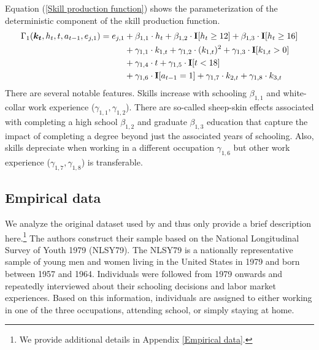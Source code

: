 \noindent Equation (\ref{Skill production function}) shows the parameterization of the deterministic component of the skill production function.
%
\begin{align}\label{Skill production function}
    \Gamma_1(\bm{k_t}, h_t, t, a_{t-1}, e_{j, 1}) = e_{j,1} & + \beta_{1,1} \cdot h_t + \beta_{1, 2} \cdot {\textbf{I}}[h_t \geq 12] + \beta_{1,3} \cdot {\textbf{I}}[h_t\geq 16]\\ \nonumber
                                  & + \gamma_{1, 1} \cdot  k_{1,t} + \gamma_{1,2} \cdot  (k_{1,t})^2 + \gamma_{1,3} \cdot  {\textbf{I}}[k_{1,t} > 0] \\ \nonumber
                                & + \gamma_{1,4} \cdot  t + \gamma_{1,5} \cdot {\textbf{I}}[t < 18]\\ \nonumber
                                  & + \gamma_{1,6} \cdot {\textbf{I}}[a_{t-1} = 1] + \gamma_{1,7} \cdot  k_{2,t} + \gamma_{1,8} \cdot  k_{3,t} \nonumber
\end{align}
%
\noindent There are several notable features. Skills increase with schooling $\beta_{1,1}$ and white-collar work experience ($\gamma_{1,1}, \gamma_{1,2}$). There are so-called sheep-skin effects associated with completing a high school $\beta_{1,2}$ and graduate $\beta_{1,3}$ education that capture the impact of completing a degree beyond just the associated years of schooling. Also, skills depreciate when working in a different occupation $\gamma_{1,6}$ but other work experience ($\gamma_{1,7}, \gamma_{1,8}$) is transferable.
\subsection{Empirical data}
We analyze the original dataset used by \citet{Keane.1997} and thus only provide a brief description here.\footnote{We provide additional details in Appendix \ref{Empirical data}.} The authors construct their sample based on the National Longitudinal Survey of Youth 1979 (NLSY79). The NLSY79 is a nationally representative sample of young men and women living in the United States in 1979 and born between 1957 and 1964. Individuals were followed from 1979 onwards and repeatedly interviewed about their schooling decisions and labor market experiences. Based on this information, individuals are assigned to either working in one of the three occupations, attending school, or simply staying at home.\\

